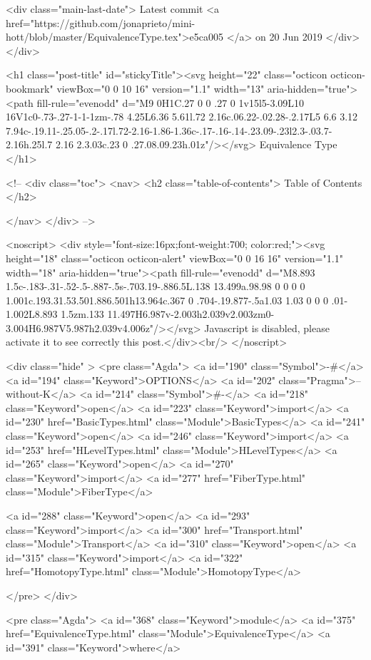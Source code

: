    <div class="main-last-date">
      Latest commit <a href="https://github.com/jonaprieto/mini-hott/blob/master/EquivalenceType.tex">e5ca005 </a> on  20 Jun 2019
    </div>
  </div>
  
  <h1 class="post-title" id="stickyTitle"><svg height="22" class="octicon octicon-bookmark" viewBox="0 0 10 16" version="1.1" width="13" aria-hidden="true"><path fill-rule="evenodd" d="M9 0H1C.27 0 0 .27 0 1v15l5-3.09L10 16V1c0-.73-.27-1-1-1zm-.78 4.25L6.36 5.61l.72 2.16c.06.22-.02.28-.2.17L5 6.6 3.12 7.94c-.19.11-.25.05-.2-.17l.72-2.16-1.86-1.36c-.17-.16-.14-.23.09-.23l2.3-.03.7-2.16h.25l.7 2.16 2.3.03c.23 0 .27.08.09.23h.01z"/></svg> Equivalence Type
  </h1>

  <!-- 
  <div class="toc">
    <nav>
    <h2 class="table-of-contents"> Table of Contents </h2>
      

    </nav>
  </div>
   -->

  <noscript>
  <div style="font-size:16px;font-weight:700; color:red;"><svg height="18" class="octicon octicon-alert" viewBox="0 0 16 16" version="1.1" width="18" aria-hidden="true"><path fill-rule="evenodd" d="M8.893 1.5c-.183-.31-.52-.5-.887-.5s-.703.19-.886.5L.138 13.499a.98.98 0 0 0 0 1.001c.193.31.53.501.886.501h13.964c.367 0 .704-.19.877-.5a1.03 1.03 0 0 0 .01-1.002L8.893 1.5zm.133 11.497H6.987v-2.003h2.039v2.003zm0-3.004H6.987V5.987h2.039v4.006z"/></svg> Javascript is disabled, please activate it to see correctly this post.</div><br/>
  </noscript>

  <div class="hide" >
<pre class="Agda">
<a id="190" class="Symbol">{-#</a> <a id="194" class="Keyword">OPTIONS</a> <a id="202" class="Pragma">--without-K</a> <a id="214" class="Symbol">#-}</a>
<a id="218" class="Keyword">open</a> <a id="223" class="Keyword">import</a> <a id="230" href="BasicTypes.html" class="Module">BasicTypes</a>
<a id="241" class="Keyword">open</a> <a id="246" class="Keyword">import</a> <a id="253" href="HLevelTypes.html" class="Module">HLevelTypes</a>
<a id="265" class="Keyword">open</a> <a id="270" class="Keyword">import</a> <a id="277" href="FiberType.html" class="Module">FiberType</a>

<a id="288" class="Keyword">open</a> <a id="293" class="Keyword">import</a> <a id="300" href="Transport.html" class="Module">Transport</a>
<a id="310" class="Keyword">open</a> <a id="315" class="Keyword">import</a> <a id="322" href="HomotopyType.html" class="Module">HomotopyType</a>

</pre>
</div>

<pre class="Agda">
<a id="368" class="Keyword">module</a> <a id="375" href="EquivalenceType.html" class="Module">EquivalenceType</a> <a id="391" class="Keyword">where</a>

